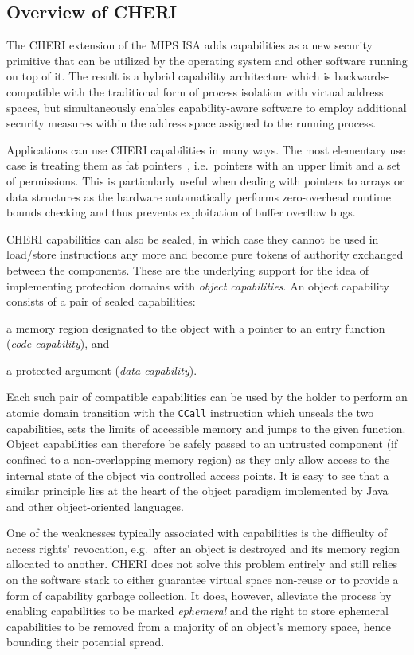 \documentclass[a4paper,12pt,twoside,openright]{report}
\newcommand{\insn}[1]{\texttt{#1}}
\begin{document}
\subsection{Overview of CHERI}

The CHERI extension of the MIPS ISA adds capabilities as a new security primitive that can be utilized by the operating system and other software running on top of it. The result is a hybrid capability architecture which is backwards-compatible with the traditional form of process isolation with virtual address spaces, but simultaneously enables capability-aware software to employ additional security measures within the address space assigned to the running process.

Applications can use CHERI capabilities in many ways. The most elementary use case is treating them as fat pointers~\cite{kwon2013low}, i.e.\ pointers with an upper limit and a set of permissions. This is particularly useful when dealing with pointers to arrays or data structures as the hardware automatically performs zero-overhead runtime bounds checking and thus prevents exploitation of buffer overflow bugs. 

CHERI capabilities can also be sealed, in which case they cannot be used in load/store instructions any more and become pure tokens of authority exchanged between the components. These are the underlying support for the idea of implementing protection domains with \emph{object capabilities}. An object capability consists of a pair of sealed capabilities: 
\begin{inparaenum}
\item a memory region designated to the object with a pointer to an entry function (\emph{code capability}), and
\item a protected argument (\emph{data capability}).
\end{inparaenum}
Each such pair of compatible capabilities can be used by the holder to perform an atomic domain transition with the \insn{CCall} instruction which unseals the two capabilities, sets the limits of accessible memory and jumps to the given function. Object capabilities can therefore be safely passed to an untrusted component (if confined to a non-overlapping memory region) as they only allow access to the internal state of the object via controlled access points. It is easy to see that a similar principle lies at the heart of the object paradigm implemented by Java and other object-oriented languages.

One of the weaknesses typically associated with capabilities is the difficulty of access rights' revocation, e.g.\ after an object is destroyed and its memory region allocated to another. CHERI does not solve this problem entirely and still relies on the software stack to either guarantee virtual space non-reuse or to provide a form of capability garbage collection. It does, however, alleviate the process by enabling capabilities to be marked \emph{ephemeral} and the right to store ephemeral capabilities to be removed from a majority of an object's memory space, hence bounding their potential spread.
\end{document}

